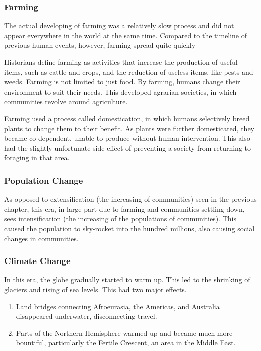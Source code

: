 \documentclass[11pt]{article}
\begin{document}
\subsubsection{Farming}
\label{sec:org7c4914a}

The actual developing of farming was a relatively slow process and did not appear everywhere in the world at the same time. Compared to the timeline of previous human events, however, farming spread quite quickly

Historians define farming as activities that increase the production of useful items, such as cattle and crops, and the reduction of useless items, like pests and weeds. Farming is not limited to just food. By farming, humans change their environment to suit their needs. This developed agrarian societies, in which communities revolve around agriculture.

Farming used a process called domestication, in which humans selectively breed plants to change them to their benefit. As plants were further domesticated, they became co-dependent, unable to produce without human intervention. This also had the slightly unfortunate side effect of preventing a society from returning to foraging in that area.

\subsubsection{Population Change}
\label{sec:orgcc5618c}

As opposed to extensification (the increasing of communities) seen in the previous chapter, this era, in large part due to farming and communities settling down, sees intensification (the increasing of the populations of communities). This caused the population to sky-rocket into the hundred millions, also causing social changes in communities.

\subsubsection{Climate Change}
\label{sec:org76f5205}

In this era, the globe gradually started to warm up. This led to the shrinking of glaciers and rising of sea levels. This had two major effects.

\begin{enumerate}
\item Land bridges connecting Afroeurasia, the Americas, and Australia disappeared underwater, disconnecting travel.
\item Parts of the Northern Hemisphere warmed up and became much more bountiful, particularly the Fertile Crescent, an area in the Middle East.
\end{enumerate}
\end{document}
